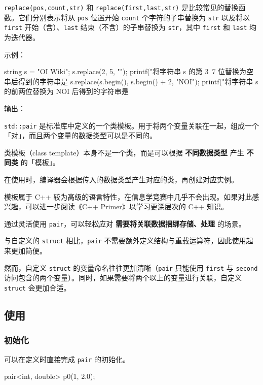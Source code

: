 \texttt{replace(pos,count,str)} 和 \texttt{replace(first,last,str)} 是比较常见的替换函数。它们分别表示将从 \texttt{pos} 位置开始 \texttt{count} 个字符的子串替换为 \texttt{str} 以及将以 \texttt{first} 开始（含）、\texttt{last} 结束（不含）的子串替换为 \texttt{str}，其中 \texttt{first} 和 \texttt{last} 均为迭代器。

示例：


\begin{codeline}
string s = "OI Wiki";
s.replace(2, 5, "");
printf("将字符串 s 的第 3~7 位替换为空串后得到的字符串是 %
s.replace(s.begin(), s.begin() + 2, "NOI");
printf("将字符串 s 的前两位替换为 NOI 后得到的字符串是 %
\end{codeline}


输出：



\texttt{std::pair} 是标准库中定义的一个类模板。用于将两个变量关联在一起，组成一个「对」，而且两个变量的数据类型可以是不同的。

类模板（class template）本身不是一个类，而是可以根据 \textbf{不同数据类型} 产生 \textbf{不同类} 的「模板」。

在使用时，编译器会根据传入的数据类型产生对应的类，再创建对应实例。

模板属于 C++ 较为高级的语言特性，在信息学竞赛中几乎不会出现。如果对此感兴趣，可以进一步阅读《C++ Primer》以学习更深层次的 C++ 知识。

通过灵活使用 \texttt{pair}，可以轻松应对 \textbf{需要将关联数据捆绑存储、处理} 的场景。

与自定义的 \texttt{struct} 相比，\texttt{pair} 不需要额外定义结构与重载运算符，因此使用起来更加简便。

然而，自定义 \texttt{struct} 的变量命名往往更加清晰（\texttt{pair} 只能使用 \texttt{first} 与 \texttt{second} 访问包含的两个变量）。同时，如果需要将两个以上的变量进行关联，自定义 \texttt{struct} 会更加合适。

\subsection{使用}\label{ux4f7fux7528}

\subsubsection{初始化}\label{ux521dux59cbux5316}

可以在定义时直接完成 \texttt{pair} 的初始化。


\begin{codeline}
pair<int, double> p0(1, 2.0);
\end{codeline}



